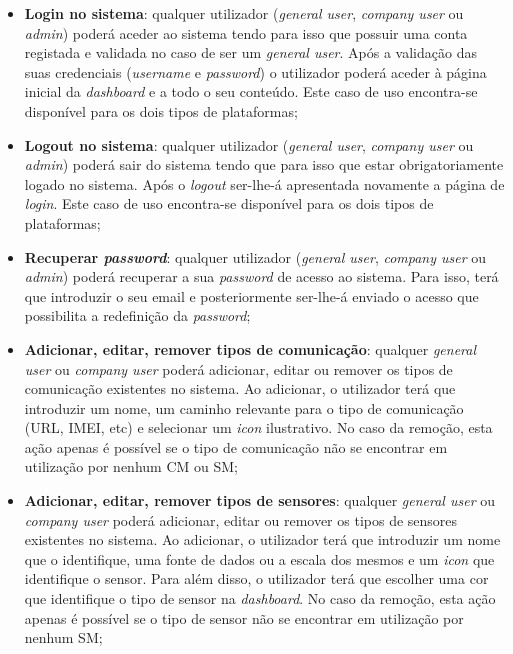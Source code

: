 \begin{itemize}
	\item \textbf{Login no sistema}: qualquer utilizador (\textit{general user}, \textit{company user} ou \textit{admin}) poderá aceder ao sistema tendo para isso que possuir uma conta registada e validada no caso de ser um \textit{general user}. Após a validação das suas credenciais (\textit{username} e \textit{password}) o utilizador poderá aceder à página inicial da \textit{dashboard} e a todo o seu conteúdo. Este caso de uso encontra-se disponível para os dois tipos de plataformas; 
	
	\item \textbf{Logout no sistema}: qualquer utilizador (\textit{general user}, \textit{company user} ou \textit{admin}) poderá sair do sistema tendo que para isso que estar obrigatoriamente logado no sistema. Após o \textit{logout} ser-lhe-á apresentada novamente a página de \textit{login}. Este caso de uso encontra-se disponível para os dois tipos de plataformas; 
	
	
	\item \textbf{Recuperar \textit{password}}: qualquer utilizador (\textit{general user}, \textit{company user} ou \textit{admin}) poderá recuperar a sua \textit{password} de acesso ao sistema. Para isso, terá que introduzir o seu email e posteriormente ser-lhe-á enviado o acesso que possibilita a redefinição da \textit{password}; 
	
	
	
	\item \textbf{Adicionar, editar, remover tipos de comunicação}: qualquer \textit{general user} ou \textit{company user} poderá adicionar, editar ou remover os tipos de comunicação existentes no sistema. Ao  adicionar, o utilizador terá que introduzir um nome, um caminho relevante para o tipo de comunicação (\ac{URL}, \ac{IMEI}, etc) e selecionar um \textit{icon} ilustrativo. No caso da remoção, esta ação apenas é possível se o tipo de comunicação não se encontrar em utilização por nenhum \acl{CM} ou \acl{SM};  
	
	\item \textbf{Adicionar, editar, remover tipos de sensores}: qualquer \textit{general user} ou \textit{company user} poderá adicionar, editar ou remover os tipos de sensores existentes no sistema. Ao  adicionar, o utilizador terá que introduzir um nome que o identifique, uma fonte de dados ou a escala dos mesmos e um \textit{icon} que identifique o sensor. Para além disso, o utilizador terá que escolher uma cor que identifique o tipo de sensor na \textit{dashboard}. No caso da remoção, esta ação apenas é possível se o tipo de sensor não se encontrar em utilização por nenhum \acl{SM};   
	 

\end{itemize}
